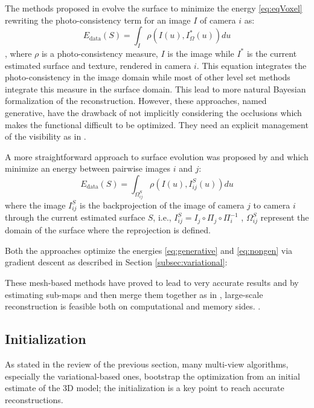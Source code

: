 The methods proposed in \cite{delaunoy_et_al_08,gargallo2007minimizing,delaunoy2011gradient} evolve the surface to minimize the energy \eqref{eq:eqVoxel} rewriting the photo-consistency term for an image $I$ of camera $i$ as:
\begin{equation}
\label{eq:generative}
  E_{\text{data}}(S) = \int_{\mathit{I}} \rho\left(I(\mathit{u}), I^*_{\Omega}(\mathit{u})\right) d\mathit{u}
\end{equation},
where $\rho$ is a photo-consistency measure, $I$ is the image while $I^*$ is the current estimated surface and texture, rendered in camera $i$.
This equation integrates the photo-consistency in the image domain while most of other level set methods integrate this measure in the surface domain. This lead to more natural Bayesian formalization of the reconstruction. 
However, these approaches, named generative, have the drawback of not implicitly considering the occlusions which makes the functional difficult to be optimized. They need an explicit management of the visibility as in \cite{delaunoy2011gradient}.

A more straightforward approach to surface evolution was proposed by \cite{hiep2009towards} and \cite{vu2011large} which minimize an energy between pairwise images $i$ and $j$:
\begin{equation}
\label{eq:nongen}
  E_{\text{data}}(S) = \int_{\Omega^{\mathit{S}}_{ij}} \rho\left(I(\mathit{u}), I^{\mathit{S}}_{ij}(\mathit{u})\right) d\mathit{u}
\end{equation}
where the image $I^{\mathit{S}}_{ij}$ is the backprojection of the image of camera $j$ to camera $i$ through the current estimated surface $\mathit{S}$, i.e., $I^{\mathit{S}}_{ij} = I_j \circ \Pi_j \circ \Pi_i^{-1}$ , $\Omega^{\mathit{S}}_{ij}$ represent the domain of the surface where the reprojection is defined.

Both the approaches optimize the energies \eqref{eq:generative} and \eqref{eq:nongen} via gradient descent as described in Section \ref{subsec:variational}:

These mesh-based methods have proved to lead to very accurate results and  by estimating  sub-maps and then merge them together as in \cite{vu2011large},  large-scale reconstruction is feasible both on computational and memory sides.
.

\subsection{Initialization}
As stated in the review of the previous section, many  multi-view algorithms, especially the variational-based ones, bootstrap the optimization from an initial estimate of the 3D model; the initialization is a key point to reach accurate reconstructions.

